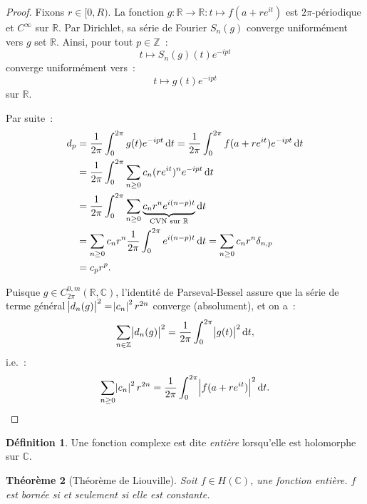 \documentclass{report}
\newtheorem{thm}{Théorème}[chapter]
\theoremstyle{definition}
\newtheorem{déf}[thm]{Définition}
\theoremstyle{remark}
\numberwithin{equation}{section}
\newcommand{\C}{\mathbb C}
\newcommand{\R}{\mathbb R}
\newcommand{\Z}{\mathbb Z}
\begin{document}
			\begin{proof} Fixons $r \in [0, R)$. La fonction $g : \R \to \R : t \mapsto f(a + re^{it})$ est $2\pi$-périodique et $C^\infty$ sur $\R$. Par Dirichlet,
			sa série de Fourier $S_n(g)$ converge uniformément vers $g$ set $\R$. Ainsi, pour tout $p \in \Z$~:
			\begin{equation}
				t \mapsto S_n(g)(t)e^{-ipt}
			\end{equation}
			converge uniformément vers~:
			\begin{equation}
				t \mapsto g(t)e^{-ipt}
			\end{equation}
			sur $\R$.

			Par suite~:
			\begin{align}
				d_p &= \frac 1{2\pi}\int_0^{2\pi}g(t)e^{-ipt}\dif t = \frac 1{2\pi}\int_0^{2\pi}f(a+re^{it})e^{-ipt}\dif t \\
				&= \frac 1{2\pi}\int_0^{2\pi}\sum_{n \geq 0}c_n(re^{it})^ne^{-ipt}\dif t \\
				&= \frac 1{2\pi}\int_0^{2\pi}\sum_{n \geq 0}\underbrace {c_nr^ne^{i(n-p)t}}_{\text{CVN sur } \R}\dif t \\
				&= \sum_{n \geq 0}c_nr^n\frac 1{2\pi}\int_0^{2\pi}e^{i(n-p)t}\dif t = \sum_{n \geq 0}c_nr^n\delta_{n,p} \\
				&= c_pr^p.
			\end{align}

			Puisque $g \in C^{0,m}_{2\pi}(\R, \C)$, l'identité de Parseval-Bessel assure que la série de terme général $\abs {d_n(g)}^2 = \abs {c_n}^2r^{2n}$ converge
			(absolument), et on a~:
			\begin{equation}
				\sum_{n \in \Z}\abs {d_n(g)}^2 = \frac 1{2\pi}\int_0^{2\pi}\abs {g(t)}^2\dif t,
			\end{equation}
			i.e.~:
			\begin{equation}
				\sum_{n \geq 0}\abs {c_n}^2r^{2n} = \frac 1{2\pi}\int_0^{2\pi}\abs {f(a+re^{it})}^2\dif t.
			\end{equation}
			\end{proof}

			\begin{déf} Une fonction complexe est dite \textit{entière} lorsqu'elle est holomorphe sur $\C$.
			\end{déf}

			\begin{thm}[Théorème de Liouville]Soit $f \in H(\C)$, une fonction entière. $f$ est bornée si et seulement si elle est constante.
			\end{thm}
\end{document}
